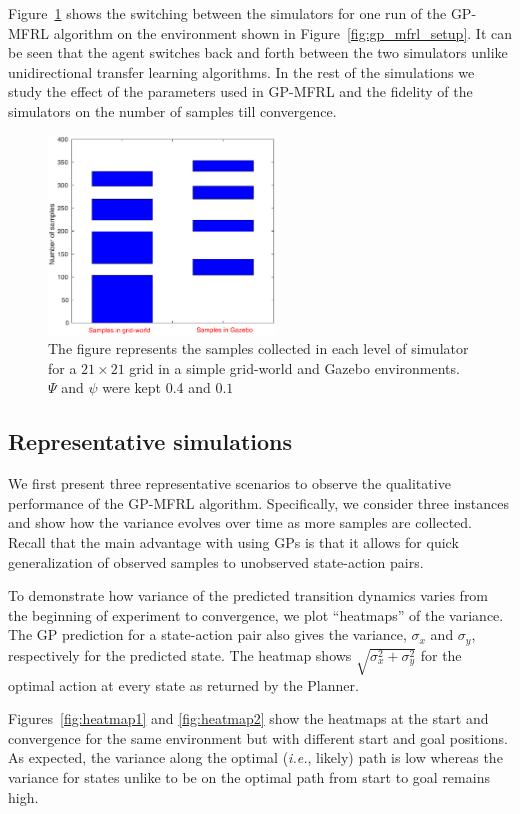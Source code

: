 \documentclass[12pt]{report}
\newcommand{\ie}{\textit{i.e.}}
\begin{document}
Figure~\ref{fig:epoch_samples} shows the switching between the simulators for one run of the GP-MFRL algorithm on the environment shown in Figure~\ref{fig:gp_mfrl_setup}. It can be seen that the agent switches back and forth between the two simulators unlike unidirectional transfer learning algorithms. In the rest of the simulations we study the effect of the parameters used in GP-MFRL and the fidelity of the simulators on the number of samples till convergence.
\begin{figure}[htp]
	\centering 
    \includegraphics[width=6cm]{epoch.eps}
	\caption{ The figure represents the samples collected in each level of simulator for a $21 \times 21$ grid in a simple grid-world and Gazebo environments. $\Psi$ and $\psi$ were kept 0.4 and $0.1$}
   \label{fig:epoch_samples}
\end{figure}

\subsection{Representative simulations}
We first present three representative scenarios to observe the qualitative performance of the GP-MFRL algorithm. Specifically, we consider three instances and show how the variance evolves over time as more samples are collected. Recall that the main advantage with using GPs is that it allows for quick generalization of observed samples to unobserved state-action pairs.

To demonstrate how variance of the predicted transition dynamics varies from the beginning of experiment to convergence, we plot ``heatmaps'' of the variance. The GP prediction for a state-action pair also gives the variance, $\sigma_x$ and $\sigma_y$, respectively for the predicted state. The heatmap shows $\sqrt{\sigma_x^2 + \sigma_y^2}$ for the optimal action at every state as returned by the Planner. 

Figures~\ref{fig:heatmap1} and \ref{fig:heatmap2} show the heatmaps at the start and convergence for the same environment but with different start and goal positions. As expected, the variance along the optimal (\ie, likely) path is low whereas the variance for states unlike to be on the optimal path from start to goal remains high. 
\end{document}
